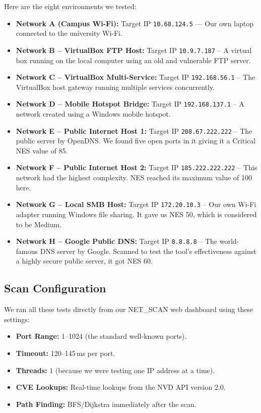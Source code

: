 \documentclass[conference]{IEEEtran}
\begin{document}
Here are the eight environments we tested:
\begin{itemize}
    \item \textbf{Network A (Campus Wi-Fi):} Target IP \texttt{10.68.124.5} --- Our own laptop connected to the university Wi-Fi.
    \item \textbf{Network B -- VirtualBox FTP Host:} Target IP \texttt{10.9.7.187} -- A virtual box running on the local computer using an old and vulnerable FTP server.
    \item \textbf{Network C -- VirtualBox Multi-Service:} Target IP \texttt{192.168.56.1} -- The VirtualBox host gateway running multiple services concurrently.
    \item \textbf{Network D -- Mobile Hotspot Bridge:} Target IP \texttt{192.168.137.1} -- A network created using a Windows mobile hotspot.
    \item \textbf{Network E -- Public Internet Host 1:} Target IP \texttt{208.67.222.222} -- The public server by OpenDNS. We found five open ports in it giving it a Critical NES value of 85.
    \item \textbf{Network F -- Public Internet Host 2:} Target IP \texttt{185.222.222.222} -- This network had the highest complexity. NES reached its maximum value of 100 here.
    \item \textbf{Network G -- Local SMB Host:} Target IP \texttt{172.20.10.3} -- Our own Wi-Fi adapter running Windows file sharing. It gave us NES 50, which is considered to be Medium.
    \item \textbf{Network H -- Google Public DNS:} Target IP \texttt{8.8.8.8} -- The world-famous DNS server by Google. Scanned to test the tool's effectiveness against a highly secure public server, it got NES 60.
\end{itemize}

\subsection{Scan Configuration}
We ran all these tests directly from our NET\_SCAN web dashboard using these settings:
\begin{itemize}
    \item \textbf{Port Range:} 1--1024 (the standard well-known ports).
    \item \textbf{Timeout:} 120--145\,ms per port.
    \item \textbf{Threads:} 1 (because we were testing one IP address at a time).
    \item \textbf{CVE Lookups:} Real-time lookups from the NVD API version 2.0.
    \item \textbf{Path Finding:} BFS/Dijkstra immediately after the scan.
\end{itemize}
\end{document}

